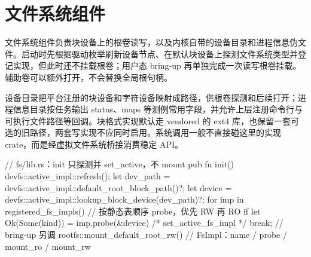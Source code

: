
\section{文件系统组件}

文件系统组件负责块设备上的根卷读写，以及内核自带的设备目录和进程信息伪文件。启动时先根据驱动枚举刷新设备节点、在默认块设备上探测文件系统类型并登记实现，但此时还不挂载根卷；用户态 bring-up 再单独完成一次读写根卷挂载。辅助卷可以额外打开，不会替换全局根句柄。

设备目录把平台注册的块设备和字符设备映射成路径，供根卷探测和后续打开；进程信息目录按任务输出 status、maps 等测例常用字段，并允许上层注册命令行与可执行文件路径等回调。块格式实现默认走 vendored 的 ext4 库，也保留一套可选的旧路径，两套写实现不应同时启用。系统调用一般不直接碰这里的实现 crate，而是经虚拟文件系统桥接消费稳定 API。

\begin{rustcode}
// fs/lib.rs：init 只探测并 set_active，不 mount
pub fn init() {
    devfs::active_impl::refresh();
    let dev_path = devfs::active_impl::default_root_block_path()?;
    let device = devfs::active_impl::lookup_block_device(dev_path)?;
    for imp in registered_fs_impls() {
        // 按静态表顺序 probe，优先 RW 再 RO
        if let Ok(Some(kind)) = imp.probe(&device) { /* set_active_fs_impl */ break; }
    }
}
// bring-up 另调 rootfs::mount_default_root_rw()
// FsImpl：name / probe / mount_ro / mount_rw
\end{rustcode}
